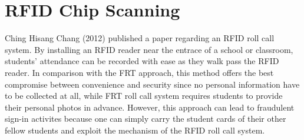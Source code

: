 \section{RFID Chip Scanning}
Ching Hisang Chang (2012) published a paper regarding an RFID roll call system.
By installing an RFID reader near the entrace of a school or classroom, students' attendance
can be recorded with ease as they walk pass the RFID reader. In comparison with the FRT approach,
this method offers the best compromise between convenience and security since no personal information
have to be collected at all, while FRT roll call system requires students to provide their personal
photos in advance. However, this approach can lead to fraudulent sign-in activites because
one can simply carry the student cards of their other fellow students and exploit the mechanism
of the RFID roll call system.
